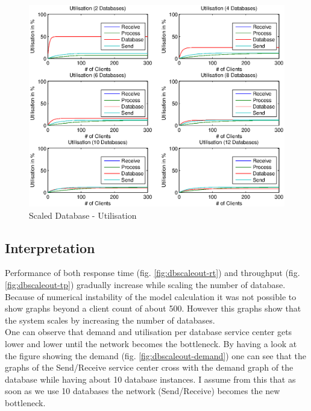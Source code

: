 \documentclass[a4paper]{article}
\begin{document}


\begin{figure}[H]
	\begin{center}
    \includegraphics[scale=0.8]{../plots-ms2-mg/dbscaleout-utilisation-0.eps}
  \end{center}
  \caption{Scaled Database - Utilisation}
  \label{fig:dbscaleout-utilisation}
\end{figure}


\subsection{Interpretation}
Performance of both response time (fig. \ref{fig:dbscaleout-rt}) and throughput (fig. \ref{fig:dbscaleout-tp}) gradually increase while scaling the number of database. Because of numerical instability of the model calculation it was not possible to show graphs beyond a client count of about 500. However this graphs show that the system scales by increasing the number of databases.\\

One can observe that demand and utilisation per database service center gets lower and lower until the network becomes the bottleneck. By having a look at the figure showing the demand (fig. \ref{fig:dbscaleout-demand}) one can see that the graphs of the Send/Receive service center cross with the demand graph of the database while having about 10 database instances. I assume from this that as soon as we use 10 databases the network (Send/Receive) becomes the new bottleneck.
\end{document}
